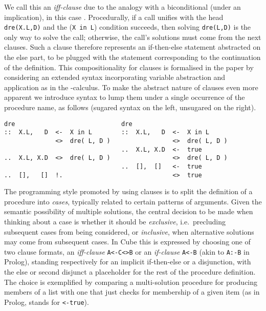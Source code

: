 \documentclass{tlp}
\newcommand{\cube}{\textsf{Cube}}
\def\mite{\textsf{if-then-else}}
\begin{document}
We call this an \emph{iff-clause} due to the analogy with a biconditional
(under an implication), in this case .  Procedurally, if a call
unifies with the head \verb+dre(X.L,D)+ and the (\verb+X in L+) condition
succeeds, then solving \verb+dre(L,D)+ is the only way to solve the call;
otherwise, the call's solutions must come from the next clauses. Such a clause
therefore represents an \textsf{if-then-else} statement abstracted on the
\textsf{else} part, to be plugged with the statement corresponding to the
continuation of the definition. This compositionality for clauses is formalised
in the paper by considering an extended syntax incorporating variable abstraction
and application as in the -calculus. To make the abstract nature of
clauses even more apparent we introduce syntax to lump them under a single occurrence
of the procedure name, as follows (sugared syntax on the left, unsugared 
on the right).

\vspace{-3.7pt}
\begin{verbatim}
dre                             dre
::  X.L,   D  <-  X in L        ::  X.L,   D  <-  X in L
              <>  dre( L, D )                 <>  dre( L, D )
                                ..  X.L, X.D  <-  true
..  X.L, X.D  <>  dre( L, D )                 <>  dre( L, D )
                                ..  [],  []   <-  true
..  [],   []  !.                              <>  true
\end{verbatim}
\vspace{-3.7pt}

The programming style promoted by using clauses is to split the definition of a
procedure into \emph{cases}, typically related to certain patterns of
arguments. Given the semantic possibility of multiple solutions, the central
decision to be made when thinking about a case is whether it should be
\emph{exclusive}, i.e.\ precluding subsequent cases from being considered, or
\emph{inclusive}, when alternative solutions may come from subsequent cases. In
\cube{} this is expressed by choosing one of two clause formats, an
\emph{iff-clause} \texttt{A<-C<>B} or an \emph{if-clause} \texttt{A<-B} (akin to
\texttt{A:-B} in Prolog), standing respectively for an implicit \mite{} or a
disjunction, with the \textsf{else} or second disjunct a placeholder for
the rest of the procedure definition. The choice is exemplified by comparing a
multi-solution procedure for producing members of a list with one that just
checks for membership of a given item (as in Prolog,  stands for
\texttt{<-true}).
\end{document}

